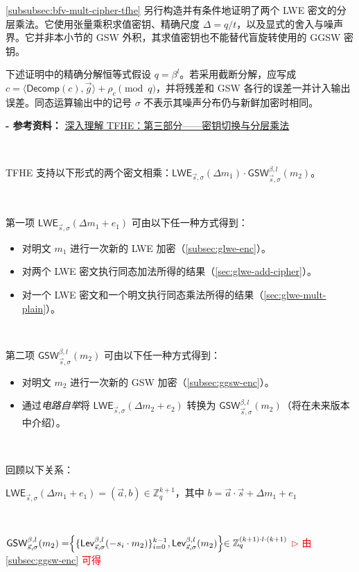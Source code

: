 \autoref{subsubsec:bfv-mult-cipher-tfhe} 另行构造并有条件地证明了两个 LWE 密文的分层乘法。它使用张量乘积求值密钥、精确尺度 $\Delta=q/t$，以及显式的舍入与噪声界。它并非本小节的 GSW 外积，其求值密钥也不能替代盲旋转使用的 GGSW 密钥。

下述证明中的精确分解恒等式假设 $q=\beta^l$。若采用截断分解，应写成 $c=\langle\textsf{Decomp}(c),\vec g\rangle+\rho_c\pmod q$，并将残差和 GSW 各行的误差一并计入输出误差。同态运算输出中的记号 $\sigma$ 不表示其噪声分布仍与新鲜加密时相同。

\textbf{- 参考资料：}
\href{https://www.zama.ai/post/tfhe-deep-dive-part-3}{深入理解 TFHE：第三部分——密钥切换与分层乘法}~\cite{tfhe-3}

$ $

TFHE 支持以下形式的两个密文相乘：$\textsf{LWE}_{\vec{s}, \sigma}(\Delta m_1) \cdot \textsf{GSW}_{\vec{s}, \sigma}^{\beta, l}(m_2)$。

$ $

\noindent 第一项 $\textsf{LWE}_{\vec{s}, \sigma}(\Delta m_1 + e_1)$ 可由以下任一种方式得到：
\begin{itemize}
\item 对明文 $m_1$ 进行一次新的 LWE 加密（\autoref{subsec:glwe-enc}）。
\item 对两个 LWE 密文执行同态加法所得的结果（\autoref{sec:glwe-add-cipher}）。
\item 对一个 LWE 密文和一个明文执行同态乘法所得的结果（\autoref{sec:glwe-mult-plain}）。
\end{itemize}

$ $

\noindent 第二项 $\textsf{GSW}_{\vec{s}, \sigma}^{\beta, l}(m_2)$ 可由以下任一种方式得到：
\begin{itemize}
\item 对明文 $m_2$ 进行一次新的 GSW 加密（\autoref{subsec:ggsw-enc}）。
\item 通过\textit{电路自举}将 $\textsf{LWE}_{\vec{s}, \sigma}(\Delta m_2 + e_2)$ 转换为 $\textsf{GSW}_{\vec{s}, \sigma}^{\beta, l}(m_2)$（将在未来版本中介绍）。
\end{itemize}

$ $

\noindent 回顾以下关系：

$\textsf{LWE}_{\vec{s}, \sigma}(\Delta m_1 + e_1) = (\vec{a}, b) \in \mathbb{Z}_{q}^{k + 1}$，其中 $b = \vec{a} \cdot \vec{s} + \Delta m_1 + e_1$

$ $

$\textsf{GSW}_{\vec{s}, \sigma}^{\beta, l}(m_2) = \Bigr \{ \{ \textsf{Lev}_{\vec{s}, \sigma}^{\beta, l} (-s_i \cdot m_2)  \}_{i=0}^{k-1}, \textsf{Lev}_{\vec{s}, \sigma}^{\beta, l}(m_2) \Bigl \} \in \mathbb{Z}_{q }^{(k+1) \cdot l \cdot (k+1)}$ \textcolor{red}{ $\rhd$ 由 \autoref{subsec:ggsw-enc} 可得}

